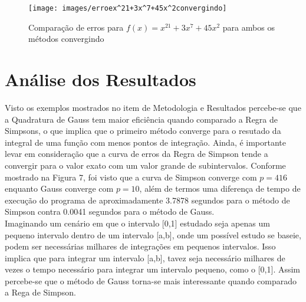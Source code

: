 \documentclass[12pt,a4paper]{article}
\begin{document}
\begin{figure}[h]
\texttt{[image: images/erroex^21+3x^7+45x^2convergindo]}
\caption{Comparação de erros para $f(x)=x^{21}+3x^7+45x^2$ para ambos os métodos convergindo}
\end{figure}


\newpage
\section{Análise dos Resultados}
\qquad Visto os exemplos mostrados no item de Metodologia e Resultados percebe-se que a Quadratura de Gauss tem maior eficiência quando comparado a Regra de Simpsons, o que implica que o primeiro método converge para o resutado da integral de uma função com menos pontos de integração. Ainda, é importante levar em consideração que a curva de erros da Regra de Simpson tende a convergir para o valor exato com um valor grande de subintervalos. Conforme mostrado na Figura 7, foi visto que a curva de Simpson converge com $p=416$ enquanto Gauss converge com $p=10$, além de termos uma diferença de tempo de execução do programa de aproximadamente 3.7878 segundos para o método de Simpson contra 0.0041 segundos para o método de Gauss.\\

\qquad Imaginando um cenário em que o intervalo [0,1] estudado seja apenas um pequeno intervalo dentro de um intervalo [a,b], onde um possível estudo se baseie, podem ser necessárias milhares de integrações em pequenos intervalos. Isso implica que para integrar um intervalo [a,b], tavez seja necessário milhares de vezes o tempo necessário para integrar um intervalo pequeno, como o [0,1]. Assim percebe-se que o método de Gauss torna-se mais interessante quando comparado a Rega de Simpson.
\newpage
\end{document}
